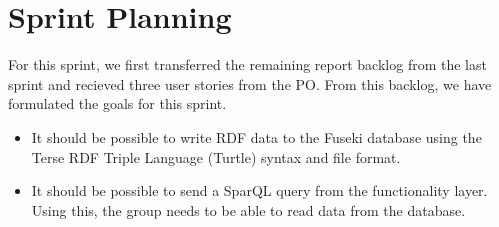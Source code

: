 \section{Sprint Planning}

For this sprint, we first transferred the remaining report backlog from the last sprint and recieved three user stories from the PO. 
From this backlog, we have formulated the goals for this sprint.

\begin{itemize}
    \item It should be possible to write RDF data to the Fuseki database using the Terse RDF Triple Language (Turtle) syntax and file format.
    \item It should be possible to send a SparQL query from the functionality layer. Using this, the group needs to be able to read data from the database.
\end{itemize}

